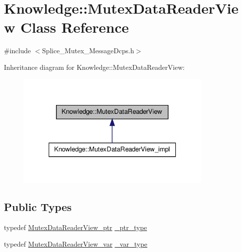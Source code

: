 \hypertarget{classKnowledge_1_1MutexDataReaderView}{
\section{Knowledge::MutexDataReaderView Class Reference}
\label{db/d72/classKnowledge_1_1MutexDataReaderView}
}


{\ttfamily \#include $<$Splice\_\-Mutex\_\-MessageDcps.h$>$}



Inheritance diagram for Knowledge::MutexDataReaderView:
\nopagebreak
\begin{figure}[H]
\begin{center}
\leavevmode
\includegraphics[width=274pt]{d2/d9b/classKnowledge_1_1MutexDataReaderView__inherit__graph}
\end{center}
\end{figure}
\subsection*{Public Types}
\begin{DoxyCompactItemize}
\item 
typedef \hyperlink{classKnowledge_1_1MutexDataReaderView}{MutexDataReaderView\_\-ptr} \hyperlink{classKnowledge_1_1MutexDataReaderView_a2cd6c0b2ff9b0ecf1e4e559634b68d18}{\_\-ptr\_\-type}
\item 
typedef \hyperlink{namespaceKnowledge_ab5f4ad419e160a86a63a5380e0ecaeb9}{MutexDataReaderView\_\-var} \hyperlink{classKnowledge_1_1MutexDataReaderView_ab34f732879f05d51fc25bf648bb464b3}{\_\-var\_\-type}
\end{DoxyCompactItemize}
